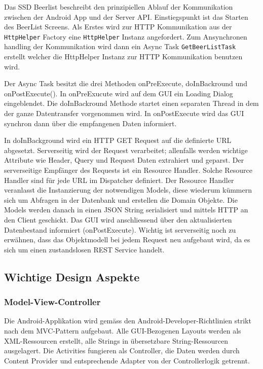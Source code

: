 \documentclass[10pt,a4paper]{scrartcl}
\begin{document}
Das SSD Beerlist beschreibt den prinzipiellen Ablauf der Kommunikation zwischen der Android App und
der Server API.  Einstiegspunkt ist das Starten des BeerList Screens. 
Als Erstes wird zur HTTP Kommunikation aus der \texttt{HttpHelper} Factory eine \texttt{HttpHelper} Instanz
angefordert. Zum Ansynchronen handling der Kommunikation wird dann ein Async Task \texttt{GetBeerListTask} erstellt welcher die HttpHelper Instanz zur HTTP Kommunikation benutzen wird. 

Der Async Task besitzt die drei Methoden onPreExecute, doInBackround und onPostExecute().
In onPreExucute wird auf dem GUI ein Loading Dialog eingeblendet. Die doInBackround Methode startet einen separaten Thread in dem der ganze Datentransfer vorgenommen wird.
In onPostExecute wird das GUI synchron dann über die empfangenen Daten informiert.


In doInBackground wird ein HTTP GET Request auf die definierte URL abgesetzt.
Serverseitig wird der Request verarbeitet; allenfalls werden wichtige Attribute wie Header, Query
und Request Daten extrahiert und geparst. Der serverseitige Empfänger des Requests ist ein Resource
Handler. Solche Resource Handler sind für jede URL im Dispatcher definiert.  Der Resource Handler
veranlasst die Instanzierung der notwendigen Models, diese wiederum kümmern sich um Abfragen in der
Datenbank und erstellen die Domain Objekte. Die Models werden danach in einen JSON String
serialisiert und mittels HTTP an den Client geschickt. Das GUI wird anschliessend über den
aktualisierten Datenbestand informiert (onPostExecute). Wichtig ist serverseitig noch zu erwähnen, dass das Objektmodell bei jedem Request neu aufgebaut wird, da es sich um einen zustandslosen REST Service handelt.

\subsection{Wichtige Design Aspekte}

\subsubsection*{Model-View-Controller}

Die Android-Applikation wird gemäss den Android-Developer-Richtlinien strikt nach dem
MVC-Pattern aufgebaut. Alle GUI-Bezogenen Layouts werden als XML-Ressourcen erstellt, alle Strings
in übersetzbare String-Ressourcen ausgelagert. Die Activities fungieren als Controller, die Daten
werden durch Content Provider und entsprechende Adapter von der Controllerlogik getrennt.
\end{document}
